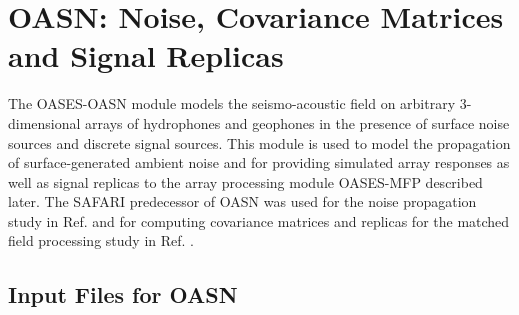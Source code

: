 \section{OASN: Noise, Covariance Matrices and Signal Replicas}

The OASES-OASN module models the seismo-acoustic field on arbitrary
3-dimensional arrays of hydrophones and geophones in the presence of
surface noise sources and discrete signal sources. This module is used
to model the propagation of surface-generated ambient noise and for
providing simulated array responses as well as signal replicas to the
array  processing module OASES-MFP described later. The SAFARI
predecessor of OASN was used for the noise propagation study in Ref.
\cite{sk:jasa88} and for computing  covariance matrices and
replicas for the matched field processing study in Ref. \cite{bks:jasa88}.

\subsection{Input Files for OASN}

